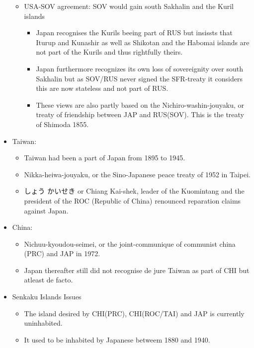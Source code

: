 \documentclass{article}
\begin{document}
\begin{itemize}
\begin{itemize}
               \item USA-SOV agreement: SOV would gain south Sakhalin and the Kuril islands
               \begin{itemize}
                    \item Japan recognises the Kurils beeing part of RUS but insissts that Iturup and Kunashir
                    as well as Shikotan and the Habomai islands are not part of the Kurils and thus rightfully theirs.
                    \item Japan furthermore recognizes its own loss of sovereignity over south Sakhalin but as SOV/RUS
                    never signed the SFR-treaty it considers this are now stateless and not part of RUS.
                    \item These views are also partly based on the Nichiro-washin-jouyaku, or treaty of friendship
                    between JAP and RUS(SOV). This is the treaty of Shimoda 1855.
               \end{itemize}
         \end{itemize}
     \item Taiwan:
         \begin{itemize}
               \item Taiwan had been a part of Japan from 1895 to 1945.
               \item Nikka-heiwa-jouyaku, or the Sino-Japanese peace treaty of 1952 in Taipei.
               \item しょう かいせき or Chiang Kai-shek, leader of the Kuomintang and the president of the ROC (Republic of China)
               renounced reparation claims against Japan.
         \end{itemize}
     \item China:
          \begin{itemize}
               \item Nichuu-kyoudou-seimei, or the joint-communique of communist china (PRC) and JAP in 1972.
               \item Japan thereafter still did not recognise de jure Taiwan as part of CHI but atleast de facto.
          \end{itemize}
     \item Senkaku Islands Issues
          \begin{itemize}
               \item The island desired by CHI(PRC), CHI(ROC/TAI) and JAP is currently uninhabited.
               \item It used to be inhabited by Japanese betweem 1880 and 1940.

\end{itemize}
\end{itemize}
\end{document}
